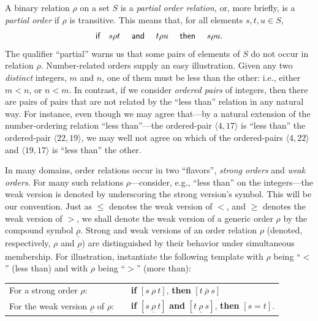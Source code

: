 A binary relation $\rho$ on a set $S$ is a {\it partial order relation}, or, more briefly, is a {\it partial order} if $\rho$ is transitive.  This means that, for all elements $s, t, u \in S$,
\begin{equation}
\label{eq:def-transitive}
\mbox{\sf if } \ \ s \rho t \ \ \ \mbox{\sf \ and } \ \ \ t \rho u \ \ \ \mbox{\sf \ then }
\ \ \ s \rho u.
\end{equation}
The qualifier ``partial'' warns us that some pairs of elements of $S$ do not occur in relation $\rho$.  Number-related orders supply an easy illustration.  Given any two {\em distinct} integers, $m$ and $n$, one of them must be less than the other: i.e., either $m < n$, or $n < m$.  In contrast, if we consider {\it ordered pairs} of integers, then there are pairs of pairs that are not related by the ``less than'' relation in any natural way.  For instance, even though we may agree that---by a natural extension of the number-ordering relation ``less than''---the ordered-pair $\langle 4, 17 \rangle$ is ``less than'' the ordered-pair $\langle 22, 19 \rangle$, we may well not agree on which of the ordered-pairs $\langle 4, 22 \rangle$ and $\langle 19, 17 \rangle$ is ``less than'' the other.

\medskip

In many domains, order relations occur in two ``flavors'', {\em strong orders} and {\em weak orders}.  For many such relations $\rho$---consider, e.g., ``less than'' on the integers---the weak version is denoted by underscoring the strong version's symbol.  This will be our convention.  Just as $\leq$ denotes the weak version of $<$, and $\geq$ denotes the weak version of $>$, we shall denote the weak version of a generic order $\rho$ by the compound symbol $\underline{\rho}$.  Strong and weak versions of an order relation $\rho$ (denoted, respectively, $\rho$ and $\underline{\rho}$) are distinguished by their behavior under simultaneous membership.  For illustration, instantiate the following template with $\rho$ being ``$<$'' (less than) and with $\rho$ being ``$>$'' (more than):

\smallskip

\begin{tabular}{lll}
For a strong order $\rho$: & &
{\bf if} $[s \ \rho \ t]$, {\bf then} $[t \ \overline{\rho} \ s]$ \\
For the weak version $\underline{\rho}$ of $\rho$: & &
{\bf if} $[s \ \underline{\rho} \ t]$ {\bf and} $[t \ \underline{\rho}
  \ s]$, {\bf then} $[s = t]$.
\end{tabular}

